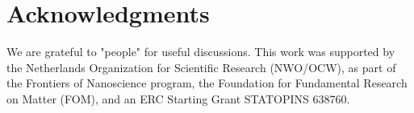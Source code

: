 \documentclass[english, twocolumn, 10pt, aps, superscriptaddress, floatfix, prb, citeautoscript]{revtex4-1}
\begin{document}
\section{Acknowledgments}
We are grateful to "people" for useful discussions.
This work was supported by the Netherlands Organization for Scientific Research (NWO/OCW), as part of the Frontiers of Nanoscience program, the Foundation for Fundamental Research on Matter (FOM), and an ERC Starting Grant STATOPINS 638760.



\end{document}
